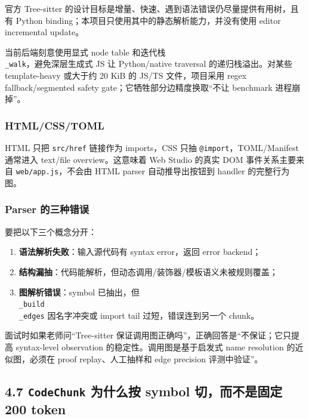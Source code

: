 \documentclass[UTF8,12pt,openany]{ctexbook}
\begin{document}
官方 Tree-sitter 的设计目标是增量、快速、遇到语法错误仍尽量提供有用树，且有 Python binding；本项目只使用其中的静态解析能力，并没有使用 editor incremental update。\par

当前后端刻意使用显式 node table 和迭代栈 \texttt{\\_walk}，避免深层生成式 JS 让 Python/native traversal 的递归栈溢出。对某些 template-heavy 或大于约 20 KiB 的 JS/TS 文件，项目采用 regex fallback/segmented safety gate；它牺牲部分边精度换取“不让 benchmark 进程崩掉”。\par

\subsubsection{HTML/CSS/TOML}

HTML 只把 \texttt{src/href} 链接作为 imports，CSS 只抽 \texttt{@import}，TOML/Manifest 通常进入 text/file overview。这意味着 Web Studio 的真实 DOM 事件关系主要来自 \texttt{web/app.js}，不会由 HTML parser 自动推导出按钮到 handler 的完整行为图。\par

\subsubsection{Parser 的三种错误}

要把以下三个概念分开：\par

\begin{enumerate}
\item \textbf{语法解析失败}：输入源代码有 syntax error，返回 error backend；
\item \textbf{结构漏抽}：代码能解析，但动态调用/装饰器/模板语义未被规则覆盖；
\item \textbf{图解析错误}：symbol 已抽出，但 \texttt{\\_build\\_edges} 因名字冲突或 import tail 过短，错误连到另一个 chunk。
\end{enumerate}

面试时如果老师问“Tree-sitter 保证调用图正确吗”，正确回答是“不保证；它只提高 syntax-level observation 的稳定性。调用图是基于启发式 name resolution 的近似图，必须在 proof replay、人工抽样和 edge precision 评测中验证”。\par

\subsection{4.7 \texttt{CodeChunk} 为什么按 symbol 切，而不是固定 200 token}
\end{document}
